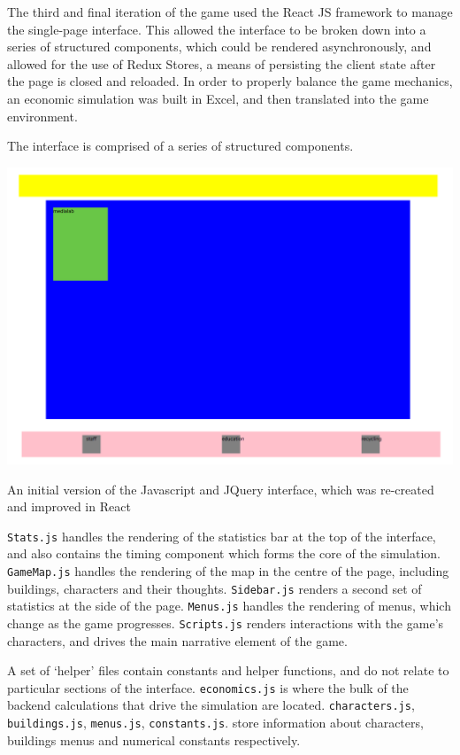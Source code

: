 \documentclass[nofonts,nols,justified,nobib]{tufte-book}
\begin{document}
The third and final iteration of the game used the React JS framework to manage the single-page interface. This allowed the interface to be broken down into a series of structured components, which could be rendered asynchronously, and allowed for the use of Redux Stores, a means of persisting the client state after the page is closed and reloaded. In order to properly balance the game mechanics, an economic simulation was built in Excel, and then translated into the game environment.

The interface is comprised of a series of structured components.
\begin{marginfigure}
\includegraphics[width=\textwidth]{img/3/prototyping/initial-map.png}
\caption{An initial version of the Javascript and JQuery interface, which was re-created and improved in React}
\end{marginfigure}
\verb|Stats.js| handles the rendering of the statistics bar at the top of the interface, and also contains the timing component which forms the core of the simulation. \verb|GameMap.js| handles the rendering of the map in the centre of the page, including buildings, characters and their thoughts. \verb|Sidebar.js| renders a second set of statistics at the side of the page. \verb|Menus.js| handles the rendering of menus, which change as the game progresses. \verb|Scripts.js| renders interactions with the game's characters, and drives the main narrative element of the game.

A set of `helper' files contain constants and helper functions, and do not relate to particular sections of the interface. \verb|economics.js| is where the bulk of the backend calculations that drive the simulation are located. \verb|characters.js|, \verb|buildings.js|, \verb|menus.js|, \verb|constants.js|. store information about characters, buildings menus and numerical constants respectively.
\end{document}

